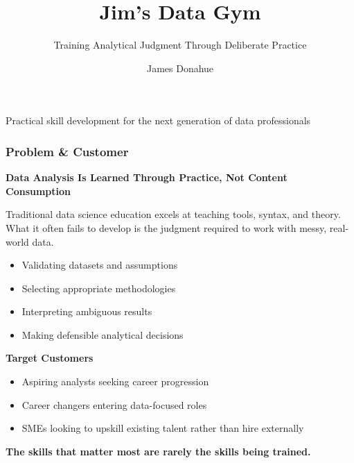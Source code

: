 \documentclass[aspectratio=169]{beamer}
\title{\textbf{Jim's Data Gym}}
\subtitle{Training Analytical Judgment Through Deliberate Practice}
\author{James Donahue}
\date{}
\begin{document}
\begin{frame}[plain]
\titlepage
\vfill
{\small Practical skill development for the next generation of data professionals}
\end{frame}

\begin{frame}
\frametitle{\textcolor{AccentPink}{Problem \& Customer}}

\Large \textbf{Data Analysis Is Learned Through Practice, Not Content Consumption}

\vspace{0.4cm}

Traditional data science education excels at teaching tools, syntax, and theory. What it often fails to develop is the judgment required to work with messy, real-world data.

\begin{itemize}
\item Validating datasets and assumptions
\item Selecting appropriate methodologies
\item Interpreting ambiguous results
\item Making defensible analytical decisions
\end{itemize}

\textbf{Target Customers}
\begin{itemize}
\item Aspiring analysts seeking career progression
\item Career changers entering data-focused roles
\item SMEs looking to upskill existing talent rather than hire externally
\end{itemize}

\textcolor{AccentPink}{\textbf{The skills that matter most are rarely the skills being trained.}}
\end{frame}
\end{document}
